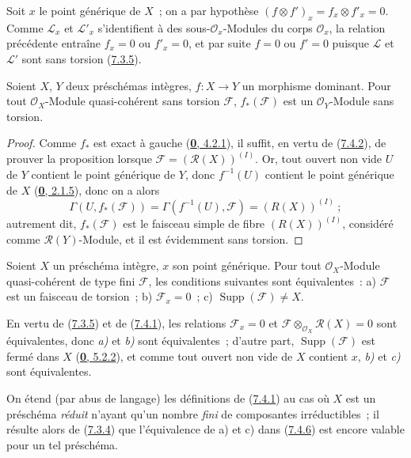 Soit $x$ le point générique de $X$~; on a par hypothèse
$(f\otimes f')_x=f_x\otimes f'_x=0$. Comme $\mathscr{L}_x$ et
$\mathscr{L}'_x$ s'identifient à des sous-$\mathscr{O}_x$-Modules du corps
$\mathscr{O}_x$, la relation précédente entraîne $f_x=0$ ou $f'_x=0$, et par
suite $f=0$ ou $f'=0$ puisque $\mathscr{L}$ et $\mathscr{L}'$ sont sans
torsion (\hyperref[I.7.3.5-fr]{7.3.5}).

\begin{proposition}[7.4.5]
\label{I.7.4.5-fr}
Soient $X$, $Y$ deux préschémas intègres, $f:X\to Y$ un morphisme dominant.
Pour tout $\mathscr{O}_X$-Module quasi-cohérent sans torsion $\mathscr{F}$,
$f_*(\mathscr{F})$ est un $\mathscr{O}_Y$-Module sans torsion.
\end{proposition}

\begin{proof}
Comme $f_*$ est exact à gauche
(\hyperref[0.4.2.1-fr]{\textbf{0}, 4.2.1}), il suffit, en vertu de
(\hyperref[I.7.4.2-fr]{7.4.2}), de prouver la proposition lorsque
$\mathscr{F}=(\mathscr{R}(X))^{(I)}$. Or, tout ouvert non vide $U$ de $Y$
contient le point générique de $Y$, donc $f^{-1}(U)$ contient le point
générique de $X$ (\hyperref[0.2.1.5-fr]{\textbf{0}, 2.1.5}), donc on a alors
\[
  \Gamma(U,f_*(\mathscr{F}))
  =\Gamma(f^{-1}(U),\mathscr{F})=(R(X))^{(I)}~;
\]
autrement dit, $f_*(\mathscr{F})$ est le faisceau simple de fibre
$(R(X))^{(I)}$, considéré comme $\mathscr{R}(Y)$-Module, et il est évidemment
sans torsion.
\end{proof}

\begin{proposition}[7.4.6]
\label{I.7.4.6-fr}
Soient $X$ un préschéma intègre, $x$ son point générique. Pour tout
$\mathscr{O}_X$-Module quasi-cohérent de type fini $\mathscr{F}$, les
conditions suivantes sont équivalentes~: \textup{a)} $\mathscr{F}$ est un faisceau de
torsion~; \textup{b)} $\mathscr{F}_x=0$~; \textup{c)}
$\operatorname{Supp}(\mathscr{F})\neq X$.
\end{proposition}

En vertu de (\hyperref[I.7.3.5-fr]{7.3.5}) et de
(\hyperref[I.7.4.1-fr]{7.4.1}), les relations $\mathscr{F}_x=0$ et
$\mathscr{F}\otimes_{\mathscr{O}_X}\mathscr{R}(X)=0$ sont équivalentes, donc
\emph{a)} et \emph{b)} sont équivalentes~; d'autre part,
$\operatorname{Supp}(\mathscr{F})$ est fermé dans $X$
(\hyperref[0.5.2.2-fr]{\textbf{0}, 5.2.2}), et comme tout ouvert non vide de $X$
contient $x$, \emph{b)} et \emph{c)} sont équivalentes.

\begin{env}[7.4.7]
\label{I.7.4.7-fr}
On étend (par abus de langage) les définitions de
(\hyperref[I.7.4.1-fr]{7.4.1}) au cas où $X$ est un préschéma
\emph{réduit} n'ayant qu'un nombre \emph{fini} de composantes irréductibles~;
il résulte alors de (\hyperref[I.7.3.4-fr]{7.3.4}) que l'équivalence de a) et
c) dans (\hyperref[I.7.4.6-fr]{7.4.6}) est encore valable pour un tel
préschéma.
\end{env}
